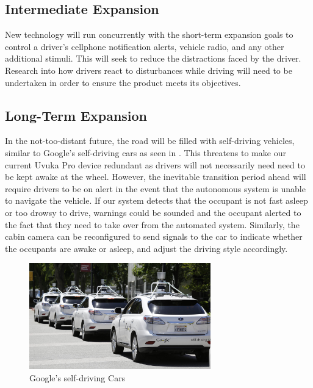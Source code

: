 \subsection{Intermediate Expansion}
New technology will run concurrently with the short-term expansion goals to control a driver's cellphone notification alerts, vehicle radio, and any other additional stimuli. This will seek to reduce the distractions faced by the driver. Research into how drivers react to disturbances while driving will need to be undertaken in order to ensure the product meets its objectives.

\subsection{Long-Term Expansion}
In the not-too-distant future, the road will be filled with self-driving vehicles, similar to Google's self-driving cars as seen in . This threatens to make our current Uvuka Pro device redundant as drivers will not necessarily need need to be kept awake at the wheel. However, the inevitable transition period ahead will require drivers to be on alert in the event that the autonomous system is unable to navigate the vehicle. If our system detects that the occupant is not fast asleep or too drowsy to drive, warnings could be sounded and the occupant alerted to the fact that they need to take over from the automated system. Similarly, the cabin camera can be reconfigured to send signals to the car to indicate whether the occupants are awake or asleep, and adjust the driving style accordingly.

\begin{figure}[H]
\centering
\includegraphics[width=0.7\textwidth]{images/Google_Cars}
\vskip10pt
\caption[Google's Self-driving Cars]{Google's self-driving Cars \cite{googlecars}}
\label{fig:gcars}
\end{figure}








